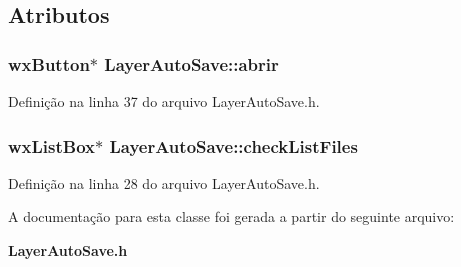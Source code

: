 \subsection{Atributos}
\subsubsection[{abrir}]{\setlength{\rightskip}{0pt plus 5cm}wx\+Button$\ast$ Layer\+Auto\+Save\+::abrir}\label{class_layer_auto_save_a4a0aa8e644892a6616fab9abbcc2b8ad}


Definição na linha 37 do arquivo Layer\+Auto\+Save.\+h.

\subsubsection[{check\+List\+Files}]{\setlength{\rightskip}{0pt plus 5cm}wx\+List\+Box$\ast$ Layer\+Auto\+Save\+::check\+List\+Files\hspace{0.3cm}{\ttfamily [protected]}}\label{class_layer_auto_save_a0a84f132fa8e804bc183864d9ce9b3b9}


Definição na linha 28 do arquivo Layer\+Auto\+Save.\+h.



A documentação para esta classe foi gerada a partir do seguinte arquivo\+:\begin{DoxyCompactItemize}
\item 
{\bf Layer\+Auto\+Save.\+h}\end{DoxyCompactItemize}
